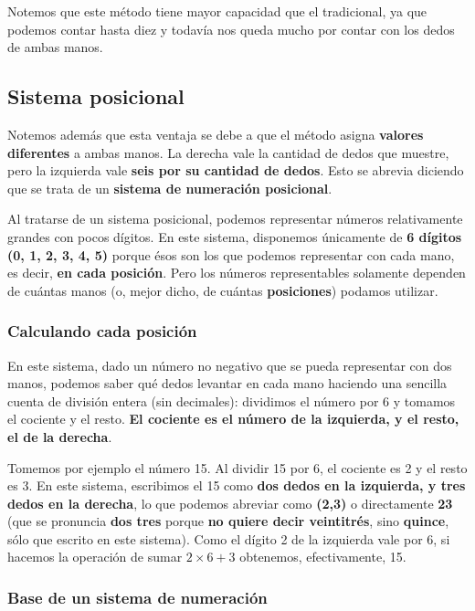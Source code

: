 \documentclass[spanish,a4paper,]{article}
\begin{document}
Notemos que este método tiene mayor capacidad que el tradicional, ya que
podemos contar hasta diez y todavía nos queda mucho por contar con los
dedos de ambas manos.

\hypertarget{sistema-posicional}{%
\subsection{Sistema posicional}\label{sistema-posicional}}

Notemos además que esta ventaja se debe a que el método asigna
\textbf{valores diferentes} a ambas manos. La derecha vale la cantidad
de dedos que muestre, pero la izquierda vale \textbf{seis por su
cantidad de dedos}. Esto se abrevia diciendo que se trata de un
\textbf{sistema de numeración posicional}.

Al tratarse de un sistema posicional, podemos representar números
relativamente grandes con pocos dígitos. En este sistema, disponemos
únicamente de \textbf{6 dígitos (0, 1, 2, 3, 4, 5)} porque ésos son los
que podemos representar con cada mano, es decir, \textbf{en cada
posición}. Pero los números representables solamente dependen de cuántas
manos (o, mejor dicho, de cuántas \textbf{posiciones}) podamos utilizar.

\hypertarget{calculando-cada-posiciuxf3n}{%
\subsubsection{Calculando cada
posición}\label{calculando-cada-posiciuxf3n}}

En este sistema, dado un número no negativo que se pueda representar con
dos manos, podemos saber qué dedos levantar en cada mano haciendo una
sencilla cuenta de división entera (sin decimales): dividimos el número
por 6 y tomamos el cociente y el resto. \textbf{El cociente es el número
de la izquierda, y el resto, el de la derecha}.

Tomemos por ejemplo el número 15. Al dividir 15 por 6, el cociente es 2
y el resto es 3. En este sistema, escribimos el 15 como \textbf{dos
dedos en la izquierda, y tres dedos en la derecha}, lo que podemos
abreviar como \textbf{(2,3)} o directamente \textbf{23} (que se
pronuncia \textbf{dos tres} porque \textbf{no quiere decir veintitrés},
sino \textbf{quince}, sólo que escrito en este sistema). Como el dígito
2 de la izquierda vale por 6, si hacemos la operación de sumar
\textbf{\(2 \times 6 + 3\)} obtenemos, efectivamente, 15.

\hypertarget{base-de-un-sistema-de-numeraciuxf3n}{%
\subsubsection{Base de un sistema de
numeración}\label{base-de-un-sistema-de-numeraciuxf3n}}
\end{document}
